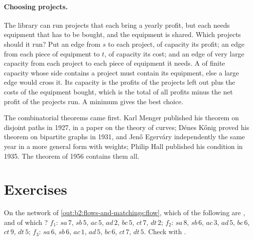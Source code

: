 \paragraph{Choosing projects.} The library can run projects that each bring a yearly profit, but each needs equipment
that has to be bought, and the equipment is shared. Which projects should it run? Put an edge from $s$ to each project,
of capacity its profit; an edge from each piece of equipment to $t$, of capacity its cost; and an edge of very large
capacity from each project to each piece of equipment it needs. A  of finite capacity whose  side contains a
project must contain its equipment, else a large edge would cross it. Its capacity is the profits of the projects
left out plus the costs of the equipment bought, which is the total of all profits minus the net profit of the
projects run. A minimum  gives the best choice.

\label{out:b2:flows-and-matchings:selection}

\begin{history}
The combinatorial theorems came first. Karl Menger published his theorem on disjoint paths in 1927, in a paper on the
theory of curves; D\'enes K\H{o}nig proved his theorem on bipartite graphs in 1931, and Jen\H{o} Egerv\'ary
independently the same year in a more general form with weights; Philip Hall published his condition in 1935. The
  theorem of 1956 contains them all.
\end{history}

\section{Exercises}\label{sec:b2:flows-and-matchings:exercises}

\begin{exercise}[$\star$]\label{exo:b2:flows-and-matchings:1}
On the network of \cref{out:b2:flows-and-matchings:flow}, which of the following are , and of which ?
$f_1$: $sa\,7$, $sb\,5$, $ac\,5$, $ad\,2$, $bc\,5$, $ct\,7$, $dt\,2$; $f_2$: $sa\,8$, $sb\,6$, $ac\,3$, $ad\,5$, $bc\,6$,
$ct\,9$, $dt\,5$; $f_3$: $sa\,6$, $sb\,6$, $ac\,1$, $ad\,5$, $bc\,6$, $ct\,7$, $dt\,5$. Check with .
\end{exercise}

